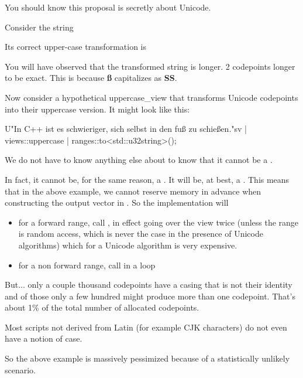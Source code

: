 \documentclass{wg21}
\begin{document}
You should know this proposal is secretly about Unicode.

Consider the string


Its correct upper-case transformation is


You will have observed that the transformed string is longer.
2 codepoints longer to be exact. This is because \textbf{ß} capitalizes as \textbf{SS}.

Now consider a hypothetical uppercase_view that transforms Unicode codepoints into their uppercase version.
It might look like this:

\begin{colorblock}
U"In C++ ist es schwieriger, sich selbst in den fuß zu schießen."sv
    | views::uppercase
    | ranges::to<std::u32string>();
\end{colorblock}

We do not have to know anything else about  to know that it cannot be a .

In fact, it cannot be, for the same reason, a .  It will be, at best, a .
This means that in the above example, we cannot reserve memory in advance when constructing the output vector in .
So the implementation will
\begin{itemize}
\item for a forward range, call , in effect going over the view twice (unless the range is random access, which is never the case in the presence of Unicode algorithms) which for a Unicode algorithm is very expensive.
\item for a non forward range, call  in a loop
\end{itemize}

But... only a couple thousand codepoints have a casing that is not their identity and of those only a few hundred might produce more than
one codepoint. That's about 1\% of the total number of allocated codepoints.

Most scripts not derived from Latin (for example CJK characters) do not even have a notion of case.

So the above example is massively pessimized because of a statistically unlikely scenario.
\end{document}
